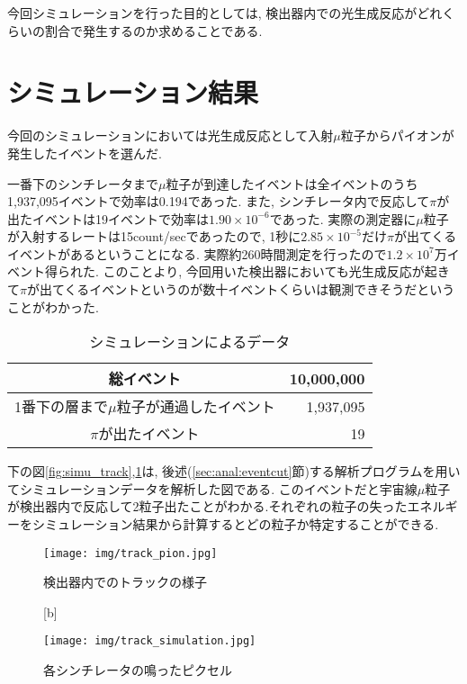 今回シミュレーションを行った目的としては, 検出器内での光生成反応がどれくらいの割合で発生するのか求めることである.

\section{シミュレーション結果}
今回のシミュレーションにおいては光生成反応として入射$\mu$粒子からパイオンが発生したイベントを選んだ.

一番下のシンチレータまで$\mu$粒子が到達したイベントは全イベントのうち1,937,095イベントで効率は0.194であった.
また, シンチレータ内で反応して$\pi$が出たイベントは19イベントで効率は$1.90 \times10^{-6}$であった.
実際の測定器に$\mu$粒子が入射するレートは15count/secであったので, 1秒に$2.85 \times10^{-5}$だけ$\pi$が出てくるイベントがあるということになる.
実際約260時間測定を行ったので$1.2 \times10^{7}$万イベント得られた.
このことより, 今回用いた検出器においても光生成反応が起きて$\pi$が出てくるイベントというのが数十イベントくらいは観測できそうだということがわかった.

\begin{table}[H]
    \centering
    \caption{シミュレーションによるデータ}
    \label{tab:simu_data}
    \begin{tabular}{|c|r|}
        \hline
        総イベント                               & 10,000,000 \\ \hline
        1番下の層まで$\mu$粒子が通過したイベント & 1,937,095  \\ \hline
        $\pi$が出たイベント                      & 19         \\ \hline
    \end{tabular}
\end{table}

下の図\ref{fig:simu_track},\ref{fig:simu_pixel}は, 後述(\ref{sec:anal:eventcut}節)する解析プログラムを用いてシミュレーションデータを解析した図である.
このイベントだと宇宙線$\mu$粒子が検出器内で反応して2粒子出たことがわかる.それぞれの粒子の失ったエネルギーをシミュレーション結果から計算するとどの粒子か特定することができる.
\begin{figure}[H]
    \begin{minipage}[b]{0.47\linewidth}
        \centering
        \texttt{[image: img/track\_pion.jpg]}
        \caption{検出器内でのトラックの様子}
        \label{fig:simu_track}
    \end{minipage}[b]
    \begin{minipage}[b]{0.47\linewidth}
        \centering
        \texttt{[image: img/track\_simulation.jpg]}
        \caption{各シンチレータの鳴ったピクセル}
        \label{fig:simu_pixel}
    \end{minipage}
\end{figure}

